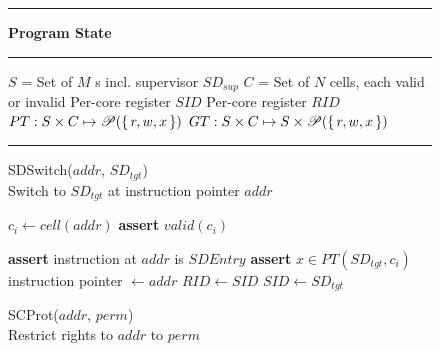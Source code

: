 \begin{figure}
  \vspace{-1\baselineskip}
  \rule{\textwidth}{1pt}
  \centering
  \textbf{\seccells Program State\\}
  \vspace{-0.5\baselineskip}
  \rule{\textwidth}{1pt}
  \vspace{-2\baselineskip}
  \begin{multicols}{2}
    \begin{algorithmic}[1]
      \State $S$ = Set of $M$ \secdiv{}s incl. supervisor $SD_{sup}$
      \State $C$ = Set of $N$ cells, each valid or invalid
      \State Per-core register $SID$
      \State Per-core register $RID$
      \State \ptable $PT: S \times C \mapsto \mathscr{P}(\set{r, w, x})$
      \State \gtable $GT: S \times C \mapsto S \times \mathscr{P}(\set{r, w, x})$
    \end{algorithmic}
  \end{multicols}
  \vspace{-1.4\baselineskip}
  \rule{\textwidth}{1pt}

\vspace{-0.7\baselineskip}
\begin{multicols}{2}
\removelatexerror


    \begin{algorithm}[H]
      \caption{SDSwitch($addr$, $SD_{tgt}$) \\
        Switch to $SD_{tgt}$ at instruction pointer $addr$   }
        \begin{algorithmic}[1]

          \State $c_i \gets cell(addr)$
          \State \textbf{assert} $valid(c_i)$

          \State \textbf{assert} instruction at $addr$ is $SDEntry$
          \State \textbf{assert} $x \in PT(SD_{tgt}, c_i)$
          \State instruction pointer $\gets addr$
          \State $RID \gets SID$
          \State $SID \gets SD_{tgt}$
        \end{algorithmic}
        \label{alg:sdswitch}
    \end{algorithm}
    \vspace{-0.5\baselineskip}

    \begin{algorithm}[H]
      \caption{SCProt($addr$, $perm$) \\
      Restrict rights to $addr$ to $perm$              }
      \begin{algorithmic}[1]


\end{algorithmic}
\end{algorithm}
\end{multicols}
\end{figure}

